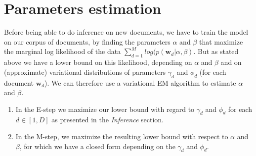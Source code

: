 \documentclass[12pt,a4paper,onecolumn]{article}
\begin{document}
\section{Parameters estimation}

Before being able to do inference on new documents, we have to train the model on our corpus of documents, by finding the parameters $\alpha$ and $\beta$ that maximize the marginal log likelihood of the data $\sum_{d=1}^M log(p(\bm{w}_d|\alpha, \beta)$. But as stated above we have a lower bound on this likelihood, depending on $\alpha$ and $\beta$ and on (approximate) variational distributions of parameters $\gamma_d$ and $\phi_d$ (for each document $\bm{w}_d$). We can therefore use a variational EM algorithm to estimate $\alpha$ and $\beta$.
\begin{enumerate}
	\item In the E-step we maximize our lower bound with regard to $\gamma_d$ and $\phi_d$ for each $d\in [1, D]$ as presented in the \textit{Inference} section.
	\item In the M-step, we maximize the resulting lower bound with respect to $\alpha$ and $\beta$, for which we have a closed form depending on the $\gamma_d$ and $\phi_d$.
\end{enumerate}
\end{document}
